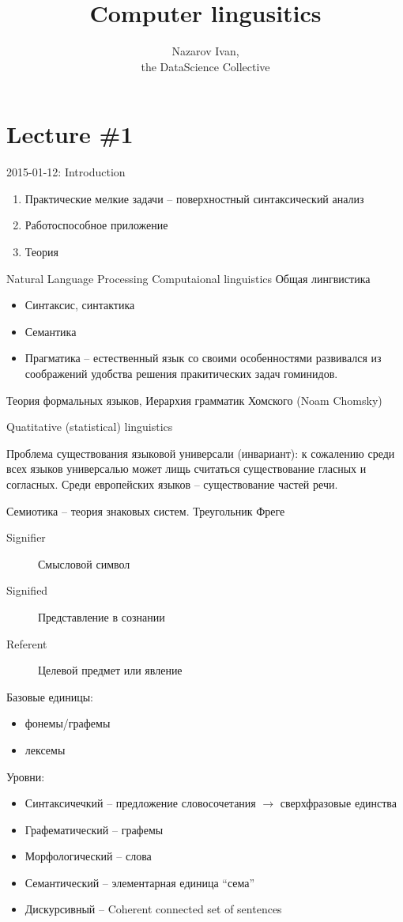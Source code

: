 \documentclass[a4paper]{article}
\title{Computer lingusitics}
\author{Nazarov Ivan, \rus{101мНОД(ИССА)}\\the DataScience Collective}
\newcommand{\eng}[1]{\foreignlanguage{english}{#1}}
\begin{document}
\maketitle

\section{Lecture \#1} %
\label{sec:lecture_1}
\eng{2015-01-12: Introduction}
\begin{enumerate}
	\item Практические мелкие задачи -- поверхностный синтаксический анализ
	\item Работоспособное приложение
	\item Теория
\end{enumerate}
\eng{Natural Language Processing}
\eng{Computaional linguistics}
Общая лингвистика \begin{itemize}
	\item Синтаксис, синтактика
	\item Семантика
	\item Прагматика -- естественный язык со своими особенностями развивался из соображений удобства решения пракитических задач гоминидов.
\end{itemize}	
Теория формальных языков, Иерархия грамматик Хомского (\eng{Noam Chomsky})

\eng{Quatitative (statistical) linguistics}

Проблема существования языковой универсали (инвариант):
к сожалению среди всех языков универсалью может лищь считаться существование гласных и согласных.
Среди европейских языков -- существование частей речи.

Семиотика -- теория знаковых систем.
Треугольник Фреге
\begin{description}
	\item[\eng{Signifier}] Смысловой символ
	\item[\eng{Signified}] Представление в сознании
	\item[\eng{Referent}] Целевой предмет или явление
\end{description}

Базовые единицы:
\begin{itemize}
	\item фонемы/графемы
	\item лексемы
\end{itemize}

Уровни:
\begin{itemize}
	\item Синтаксичечкий -- предложение
		словосочетания $\to$ сверхфразовые единства
	\item Графематический -- графемы
	\item Морфологический -- слова
	\item Семантический -- элементарная единица ``сема''
	\item Дискурсивный -- \eng{Coherent connected set of sentences}
\end{itemize}
\end{document}
